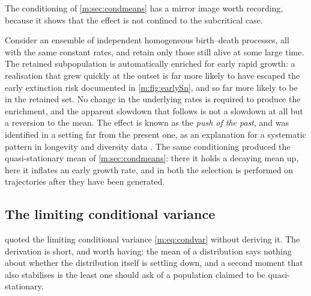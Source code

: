 The conditioning of \cref{m:sec:condmeans} has a mirror image worth recording,
because it shows that the effect is not confined to the subcritical case.

Consider an ensemble of independent homogeneous birth--death processes, all with
the same constant rates, and retain only those still alive at some large time. The
retained subpopulation is automatically enriched for early rapid growth: a
realisation that grew quickly at the outset is far more likely to have escaped the
early extinction risk documented in \cref{m:fig:earlySn}, and so far more likely to
be in the retained set. No change in the underlying rates is required to produce the
enrichment, and the apparent slowdown that follows is not a slowdown at all but a
reversion to the mean. The effect is known as the \emph{push of the past}, and was
identified in a setting far from the present one, as an explanation for a
systematic pattern in longevity and diversity data \cite{Budd2018}. The same
conditioning produced the quasi-stationary mean of \cref{m:sec:condmeans}: there it
holds a decaying mean up, here it inflates an early growth rate, and in both the
selection is performed on trajectories after they have been generated.

\subsection{The limiting conditional variance}
\label{m:app:condvariance}

 quoted the limiting conditional variance
\cref{m:eq:condvar} without deriving it. The derivation is short, and worth having:
the mean of a distribution says nothing about whether the distribution itself is
settling down, and a second moment that also stabilises is the least one should ask
of a population claimed to be quasi-stationary.


